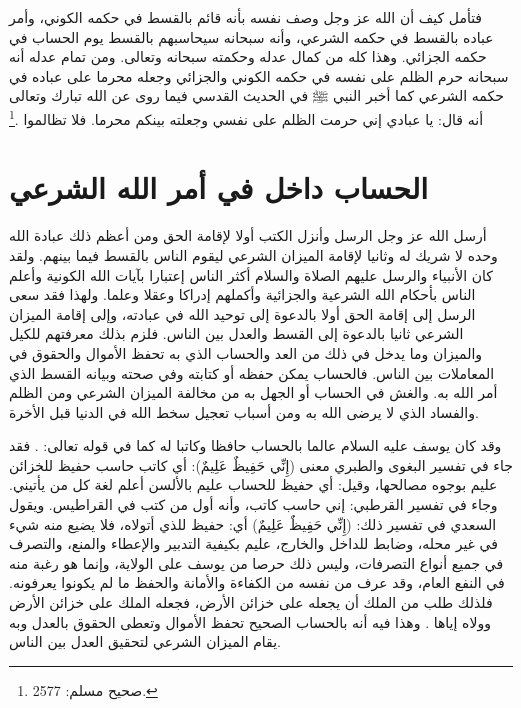 فتأمل كيف أن الله عز وجل وصف نفسه بأنه قائم بالقسط في حكمه الكوني، وأمر عباده بالقسط في حكمه الشرعي، وأنه سبحانه سيحاسبهم بالقسط يوم الحساب في حكمه الجزائي. وهذا كله من كمال عدله وحكمته سبحانه وتعالى. ومن تمام عدله أنه سبحانه حرم الظلم على نفسه في حكمه الكوني والجزائي وجعله محرما على عباده في حكمه الشرعي كما أخبر النبي ﷺ في الحديث القدسي فيما روى عن الله تبارك وتعالى أنه قال: يا عبادي إني حرمت الظلم على نفسي وجعلته بينكم محرما. فلا تظالموا \href{https://shamela.ws/book/1727/6507#p3}{\faExternalLink} \cite{muslim}.\footnote{صحيح مسلم: 2577.}

\section{الحساب داخل في أمر الله الشرعي}

أرسل الله عز وجل الرسل وأنزل الكتب أولا لإقامة الحق ومن أعظم ذلك عبادة الله وحده لا شريك له وثانيا لإقامة الميزان الشرعي ليقوم الناس بالقسط فيما بينهم. ولقد كان الأنبياء والرسل عليهم الصلاة والسلام أكثر الناس إعتبارا بآيات الله الكونية وأعلم الناس بأحكام الله الشرعية والجزائية وأكملهم إدراكا وعقلا وعلما. ولهذا فقد سعى الرسل إلى إقامة الحق أولا بالدعوة إلى توحيد الله في عبادته، وإلى إقامة الميزان الشرعي ثانيا بالدعوة إلى القسط والعدل بين الناس. فلزم بذلك معرفتهم للكيل والميزان وما يدخل في ذلك من العد والحساب الذي به تحفظ الأموال والحقوق في المعاملات بين الناس. فالحساب يمكن حفظه أو كتابته وفي صحته وبيانه القسط الذي أمر الله به. والغش في الحساب أو الجهل به من مخالفة الميزان الشرعي ومن الظلم والفساد الذي لا يرضى الله به ومن أسباب تعجيل سخط الله في الدنيا قبل الأخرة. 

وقد كان يوسف عليه السلام عالما بالحساب حافظا وكاتبا له كما في قوله تعالى: \quranayah*[12][55]{\footnotesize \surahname*[12]}. فقد جاء في تفسير البغوى والطبري معنى (إِنِّي حَفِيظٌ عَلِيمٌ): أي كاتب حاسب حفيظ للخزائن عليم بوجوه مصالحها، وقيل: أي حفيظ للحساب عليم بالألسن أعلم لغة كل من يأتيني. وجاء في تفسير القرطبي: إني حاسب كاتب، وأنه أول من كتب في القراطيس. ويقول السعدي في تفسير ذلك: (إِنِّي حَفِيظٌ عَلِيمٌ) أي: حفيظ للذي أتولاه، فلا يضيع منه شيء في غير محله، وضابط للداخل والخارج، عليم بكيفية التدبير والإعطاء والمنع، والتصرف في جميع أنواع التصرفات، وليس ذلك حرصا من يوسف على الولاية، وإنما هو رغبة منه في النفع العام، وقد عرف من نفسه من الكفاءة والأمانة والحفظ ما لم يكونوا يعرفونه. فلذلك طلب من الملك أن يجعله على خزائن الأرض، فجعله الملك على خزائن الأرض وولاه إياها \href{https://shamela.ws/book/42/841#p5}{\faExternalLink} \cite{tafsir_Saadi}. وهذا فيه أنه بالحساب الصحيح تحفظ الأموال وتعطى الحقوق بالعدل وبه يقام الميزان الشرعي لتحقيق العدل بين الناس.

